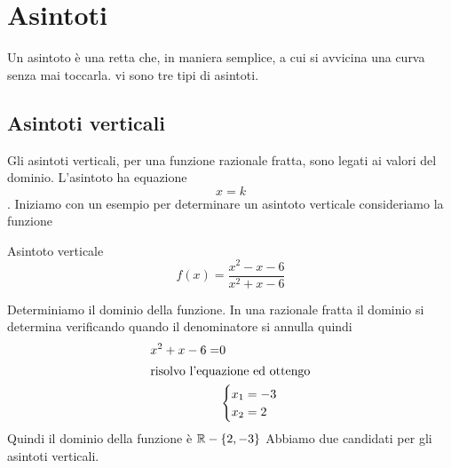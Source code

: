 \chapter{Asintoti}
Un asintoto è una retta che, in maniera semplice, a cui si avvicina una curva senza mai toccarla. vi sono tre tipi di asintoti. 
\section{Asintoti verticali}
Gli asintoti verticali, per una funzione razionale fratta, sono legati ai valori del dominio. L'asintoto ha equazione \[ x=k\].
Iniziamo con un esempio per determinare un asintoto verticale 
consideriamo la funzione 
\begin{esempiot}{Asintoto verticale}{}
\[f(x)=\dfrac{x^2-x-6}{x^2+x-6} \]
\end{esempiot}
Determiniamo il dominio
della funzione. In una razionale fratta il dominio si determina verificando quando il denominatore si annulla quindi
\begin{align*}
x^2+x-6=&0\\
\intertext{risolvo l'equazione ed ottengo}
&\begin{cases}
x_1=-3\\
x_2=2
\end{cases}
\end{align*}
Quindi il dominio della funzione è $\mathbb{R}-\lbrace2,-3\rbrace$ Abbiamo due candidati per gli asintoti verticali.